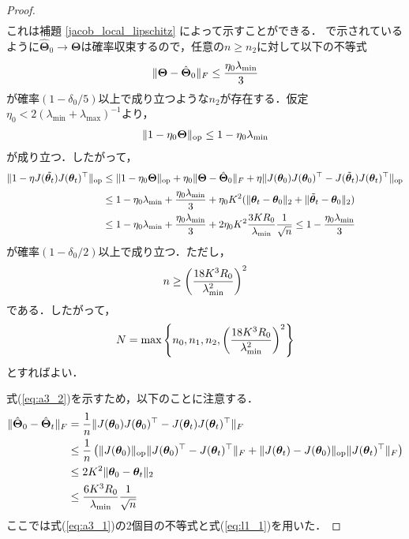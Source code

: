 \begin{proof}
\begin{align}
    \end{align}
    これは補題 \ref{jacob_local_lipschitz} によって示すことができる．\citet{yang2019scaling} で示されているように$\hat{\bm{\Theta}}_0 \rightarrow \bm{\Theta}$は確率収束するので，任意の$n \geq n_2$に対して以下の不等式
    \begin{align}
        \|\bm{\Theta} - \hat{\bm{\Theta}}_0\|_F \leq \dfrac{\eta_0 \lambda_{\min}}{3}
    \end{align}
    が確率$(1 - \delta_0 / 5)$以上で成り立つような$n_2$が存在する．仮定$\eta_0 < 2(\lambda_{\min} + \lambda_{\max})^{-1}$より，
    \begin{align}
        \|1 - \eta_0 \bm{\Theta}\|_{\mathrm{op}} \leq 1 - \eta_0 \lambda_{\min}
    \end{align}
    が成り立つ．したがって，
    \begin{align}
        \|1 - \eta J(\tilde{\bm{\theta}_t})J(\bm{\theta}_t)^\top\|_{\mathrm{op}} &\leq \|1 - \eta_0 \bm{\Theta}\|_{\mathrm{op}} + \eta_0 \|\bm{\Theta} - \hat{\bm{\Theta}}_0\|_F + \eta\|J(\bm{\theta}_0)J(\bm{\theta}_0)^\top - J(\tilde{\bm{\theta}}_t)J(\bm{\theta}_t)^\top\|_{\mathrm{op}} \\
        &\leq 1 - \eta_0 \lambda_{\min} + \dfrac{\eta_0 \lambda_{\min}}{3} + \eta_0 K^2 (\|\bm{\theta}_t - \bm{\theta}_0\|_2 + \|\tilde{\bm{\theta}}_t - \bm{\theta}_0\|_2) \\
        &\leq 1 - \eta_0 \lambda_{\min} + \dfrac{\eta_0 \lambda_{\min}}{3} + 2\eta_0 K^2 \dfrac{3KR_0}{\lambda_{\min}}\dfrac{1}{\sqrt{n}} \leq 1 - \dfrac{\eta_0 \lambda_{\min}}{3}
    \end{align}
    が確率$(1 - \delta_0 / 2)$以上で成り立つ．ただし，
    \begin{align}
        n \geq \left(\dfrac{18K^3 R_0}{\lambda_{\min}^2}\right)^2
    \end{align}
    である．したがって，
    \begin{align}
        N = \max\left\{n_0, n_1, n_2, \left(\dfrac{18K^3 R_0}{\lambda_{\min}^2}\right)^2\right\}
    \end{align}
    とすればよい．

    式(\ref{eq:a3_2})を示すため，以下のことに注意する．
    \begin{align}
        \|\hat{\bm{\Theta}}_0 - \hat{\bm{\Theta}}_t\|_F &= \dfrac{1}{n}\|J(\bm{\theta}_0)J(\bm{\theta}_0)^\top - J(\bm{\theta}_t)J(\bm{\theta}_t)^\top\|_F \\
        &\leq \dfrac{1}{n}\left(\|J(\bm{\theta}_0)\|_{\mathrm{op}}\|J(\bm{\theta}_0)^\top - J(\bm{\theta}_t)^\top\|_F + \|J(\bm{\theta}_t) - J(\bm{\theta}_0)\|_{\mathrm{op}}\|J(\bm{\theta}_t)^\top\|_F\right) \\
        &\leq 2K^2 \|\bm{\theta}_0 - \bm{\theta}_t\|_2 \\
        &\leq \dfrac{6K^3 R_0}{\lambda_{\min}}\dfrac{1}{\sqrt{n}}
    \end{align}
    ここでは式(\ref{eq:a3_1})の2個目の不等式と式(\ref{eq:l1_1})を用いた．
\end{proof}

